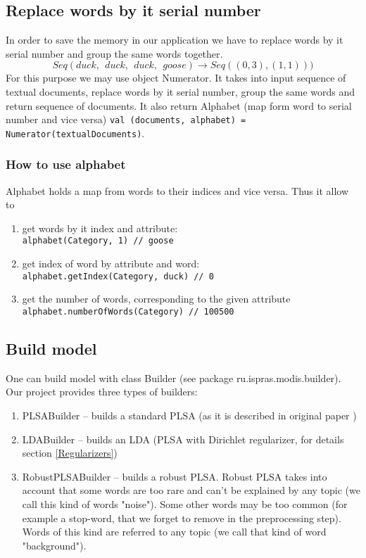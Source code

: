 \subsection{Replace words by it serial number}
    In order to save the memory in our application we have to replace words by it serial number and group the same words together.
    $$ Seq(duck, \ \ duck, \ \ duck, \ \ goose) \to Seq((0, 3), (1, 1))) $$
    For this purpose we may use object Numerator. It takes into input sequence of textual documents, replace words by it serial number,
    group the same words and return sequence of documents. It also return Alphabet (map form word to serial number and vice versa)
    \texttt{val (documents, alphabet) = Numerator(textualDocuments)}.\\ 
    \subsubsection{How to use alphabet}
	Alphabet holds a map from words to their indices and vice versa. Thus it allow to
	\begin{enumerate}
	    \item get words by it index and attribute:\\
		\texttt{alphabet(Category, 1) // goose}
	    \item get index of word by attribute and word: \\
		\texttt{alphabet.getIndex(Category, duck) // 0}
	    \item get the number of words, corresponding to the given attribute \\
		\texttt{alphabet.numberOfWords(Category) // 100500}
	\end{enumerate}
	
\subsection{Build model}
    One can build model with class Builder (see package ru.ispras.modis.builder). Our project provides three types of builders:
    \begin{enumerate}
	\item PLSABuilder \--- builds a standard PLSA (as it is described in original paper \cite{PLSA_original})
	\item LDABuilder  \--- builds an LDA (PLSA with Dirichlet regularizer, for details section \ref{Regularizers})
	\item RobustPLSABuilder \--- builds a robust PLSA. Robust PLSA takes into account that some words are too rare and can't be explained by any topic 
	    (we call this kind of words "noise"). Some other words may be too common (for example a stop\--word, that we forget to remove in the preprocessing step). Words of this kind
	    are referred to any topic (we call that kind of word "background").  
    \end{enumerate}

